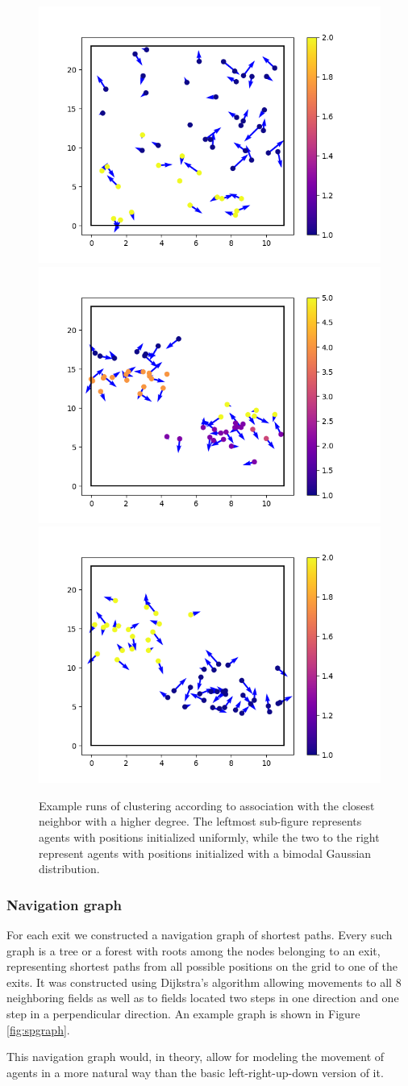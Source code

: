 \documentclass[9pt]{pnas-new}
\begin{document}
\begin{figure}[h!]
    \centering
    \includegraphics[width=0.3\linewidth]{fig/Figure_2.png}
    \hfill
    \includegraphics[width=0.3\linewidth]{fig/Figure_3.png}
    \hfill
    \includegraphics[width=0.3\linewidth]{fig/Figure_4.png}
    \caption{Example runs of clustering according to association with the closest neighbor with a higher degree. The leftmost sub-figure represents agents with positions initialized uniformly, while the two to the right represent agents with positions initialized with a bimodal Gaussian distribution.}
    \label{fig:enter-label}
\end{figure}

\subsubsection{Navigation graph}

For each exit we constructed a navigation graph of shortest paths. Every such graph is a tree or a forest with roots among the nodes belonging to an exit, representing shortest paths from all possible positions on the grid to one of the exits. It was constructed using Dijkstra's algorithm allowing movements to all 8 neighboring fields as well 
as to fields located two steps in one direction and one step in a perpendicular direction.
An example graph is shown in Figure \ref{fig:spgraph}.

This navigation graph would, in theory, allow for modeling the movement of agents in a more natural way than the basic left-right-up-down version of it.
\end{document}
